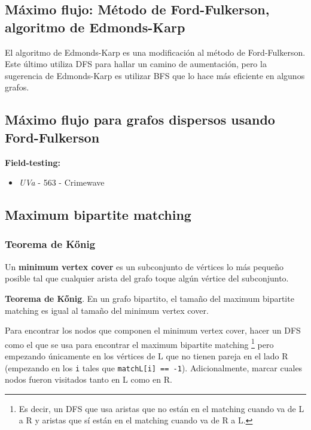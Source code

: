\documentclass[10pt,letterpaper,twocolumn]{article}
\newcommand{\codigofuente}[1]{

\dotfill
}
\begin{document}
\codigofuente{./src/grafos/lca.cpp}

\subsection{Máximo flujo: Método de Ford-Fulkerson, algoritmo de Edmonds-Karp}
El algoritmo de Edmonds-Karp es una modificación al método de Ford-Fulkerson. Este último
utiliza DFS para hallar un camino de aumentación, pero la sugerencia de Edmonds-Karp
es utilizar BFS que lo hace más eficiente en algunos grafos.
\medskip

\codigofuente{./src/grafos/ford_fulkerson.cpp}

\subsection{Máximo flujo para grafos dispersos usando Ford-Fulkerson}

\small
\textbf{Field-testing:}
\begin{itemize}
\item \emph{UVa} - 563 - Crimewave
\end{itemize}
\normalsize

\codigofuente{./src/grafos/ford_fulkerson_sparse.cpp}

\subsection{Maximum bipartite matching}
\codigofuente{./src/grafos/maximum_bipartite_matching.cpp}

\subsubsection{Teorema de Kőnig}

Un \textbf{minimum vertex cover} es un subconjunto de vértices lo más pequeño posible tal que cualquier arista del grafo toque algún vértice del subconjunto.

\textbf{Teorema de Kőnig}. En un grafo bipartito, el tamaño del maximum bipartite matching es igual al tamaño del minimum vertex cover.

\medskip

Para encontrar los nodos que componen el minimum vertex cover, hacer un DFS como el que se usa para encontrar el maximum bipartite matching \footnote{Es decir, un DFS que usa aristas que no están en el matching cuando va de L a R y aristas que sí están en el matching cuando va de R a L.} pero empezando únicamente en los vértices de L que no tienen pareja en el lado R (empezando en los \texttt{i} tales que \texttt{matchL[i] == -1}). Adicionalmente, marcar cuales nodos fueron visitados tanto en L como en R.
\end{document}
